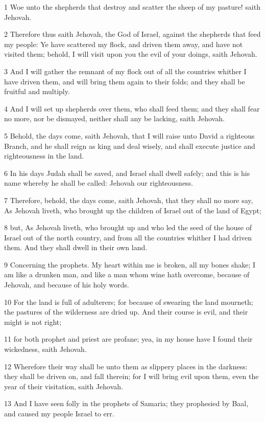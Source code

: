 \par 1 Woe unto the shepherds that destroy and scatter the sheep of my pasture! saith Jehovah.
\par 2 Therefore thus saith Jehovah, the God of Israel, against the shepherds that feed my people: Ye have scattered my flock, and driven them away, and have not visited them; behold, I will visit upon you the evil of your doings, saith Jehovah.
\par 3 And I will gather the remnant of my flock out of all the countries whither I have driven them, and will bring them again to their folds; and they shall be fruitful and multiply.
\par 4 And I will set up shepherds over them, who shall feed them; and they shall fear no more, nor be dismayed, neither shall any be lacking, saith Jehovah.
\par 5 Behold, the days come, saith Jehovah, that I will raise unto David a righteous Branch, and he shall reign as king and deal wisely, and shall execute justice and righteousness in the land.
\par 6 In his days Judah shall be saved, and Israel shall dwell safely; and this is his name whereby he shall be called: Jehovah our righteousness.
\par 7 Therefore, behold, the days come, saith Jehovah, that they shall no more say, As Jehovah liveth, who brought up the children of Israel out of the land of Egypt;
\par 8 but, As Jehovah liveth, who brought up and who led the seed of the house of Israel out of the north country, and from all the countries whither I had driven them. And they shall dwell in their own land.
\par 9 Concerning the prophets. My heart within me is broken, all my bones shake; I am like a drunken man, and like a man whom wine hath overcome, because of Jehovah, and because of his holy words.
\par 10 For the land is full of adulterers; for because of swearing the land mourneth; the pastures of the wilderness are dried up. And their course is evil, and their might is not right;
\par 11 for both prophet and priest are profane; yea, in my house have I found their wickedness, saith Jehovah.
\par 12 Wherefore their way shall be unto them as slippery places in the darkness: they shall be driven on, and fall therein; for I will bring evil upon them, even the year of their visitation, saith Jehovah.
\par 13 And I have seen folly in the prophets of Samaria; they prophesied by Baal, and caused my people Israel to err.
